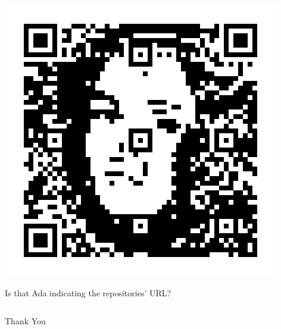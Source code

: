 \begin{frame}
\begin{columns}
\begin{column}{0.25\textwidth}
\centering
\includegraphics[width=\columnwidth]{qart.png}
\caption{Is that Ada indicating the repositories' URL?}
\end{column}

\end{columns}
\normalsize
\end{frame}

\begin{frame}
\begin{center}
\begin{figure}[H]
	\centering
\end{figure}

\Huge \textcolor{cvut_blue}{Thank You}
\end{center}
\end{frame}
